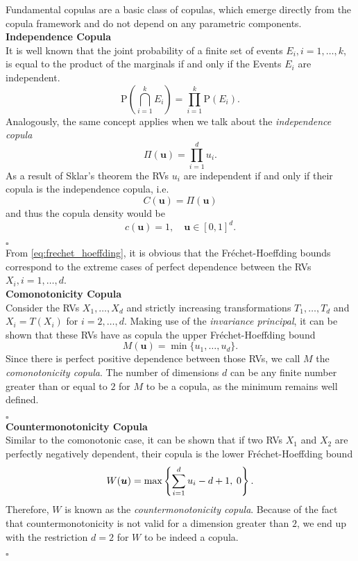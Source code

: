 
Fundamental copulas are a basic class of copulas, which emerge directly from the copula framework and do not depend on any parametric components. \\

\textbf{Independence Copula}\\
It is well known that the joint probability of a finite set of events
$E_i, i = 1, \ldots, k$, is equal to the product of the marginals if and only if the Events $E_i$ are independent.
$$\mathrm{P}\left(\bigcap_{i=1}^{k} E_{i}\right)=\prod_{i=1}^{k} \mathrm{P}\left(E_{i}\right).$$
Analogously, the same concept applies when we talk about the \textit{independence copula}
\begin{equation}
\Pi (\bm{u}) = \prod \limits _{i = 1}^d u_i.
\end{equation}
As a result of Sklar's theorem the \ac{RV}s $u_i$ are independent if and only if their copula is the independence copula, i.e.
$$ C(\bm{u}) = \Pi (\bm{u}) $$
and thus the copula density would be 
$$c(\boldsymbol{u})=1, \quad \boldsymbol{u} \in[0,1]^{d}.$$

\hfill $\square$ \\


From \autoref{eq:frechet_hoeffding}, it is obvious that the Fr\'echet-Hoeffding bounds correspond to the extreme cases of perfect dependence between the \ac{RV}s $X_i, i = 1, \ldots, d$. \\

\textbf{Comonotonicity Copula}\\
Consider the \ac{RV}s $X_1, \ldots, X_d$ and strictly increasing transformations $T_1, \ldots, T_d$ and $X_i = T(X_i)$ for $i = 2, \ldots, d$. Making use of the \textit{invariance principal}, it can be shown that these \ac{RV}s have as copula the upper Fr\'echet-Hoeffding bound 
$$M(\bm{u}) = \min\{ u_1, \ldots, u_d \}.$$ Since there is perfect positive dependence between those \ac{RV}s, we call $M$ the \textit{comonotonicity copula}. The number of dimensions $d$ can be any finite number greater than or equal to $2$ for $M$ to be a copula, as the minimum remains well defined.

\hfill $\square$ \\



\textbf{Countermonotonicity Copula}\\
Similar to the comonotonic case, it can be shown that if two \acp{RV} $X_1$ and $X_2$ are perfectly negatively dependent, their copula is the lower Fr\'echet-Hoeffding bound
$$
W(\boldsymbol{u})=\max \left\{\sum\limits_{i=1}^{d} u_{i}-d+1, \hspace{0.25em} 0\right\}.
$$
Therefore, $W$ is known as the \textit{countermonotonicity copula}. Because of the fact that countermonotonicity is not valid for a dimension greater than $2$, we end up with the restriction $d=2$ for $W$ to be indeed a copula.

\hfill $\square$ \\








